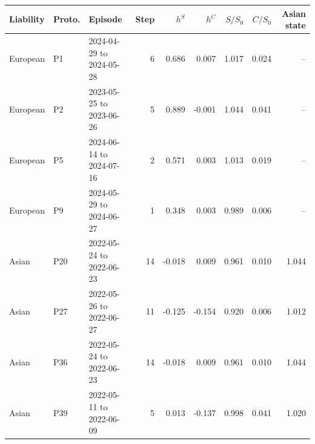 \begin{tabular}{lllrrrrrr}
\toprule
Liability & Proto. & Episode & Step & $h^S$ & $h^C$ & $S/S_0$ & $C/S_0$ & Asian state \\
\midrule
European & P1 & 2024-04-29 to 2024-05-28 & 6 & 0.686 & 0.007 & 1.017 & 0.024 & -- \\
European & P2 & 2023-05-25 to 2023-06-26 & 5 & 0.889 & -0.001 & 1.044 & 0.041 & -- \\
European & P5 & 2024-06-14 to 2024-07-16 & 2 & 0.571 & 0.003 & 1.013 & 0.019 & -- \\
European & P9 & 2024-05-29 to 2024-06-27 & 1 & 0.348 & 0.003 & 0.989 & 0.006 & -- \\
Asian & P20 & 2022-05-24 to 2022-06-23 & 14 & -0.018 & 0.009 & 0.961 & 0.010 & 1.044 \\
Asian & P27 & 2022-05-26 to 2022-06-27 & 11 & -0.125 & -0.154 & 0.920 & 0.006 & 1.012 \\
Asian & P36 & 2022-05-24 to 2022-06-23 & 14 & -0.018 & 0.009 & 0.961 & 0.010 & 1.044 \\
Asian & P39 & 2022-05-11 to 2022-06-09 & 5 & 0.013 & -0.137 & 0.998 & 0.041 & 1.020 \\
\bottomrule
\end{tabular}
